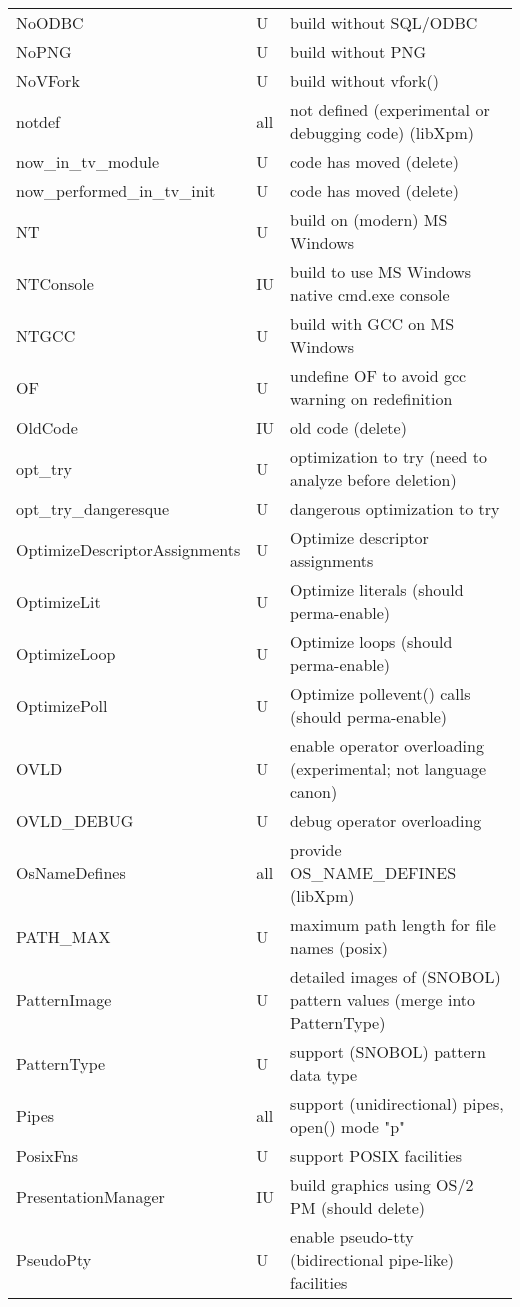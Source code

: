 \begin{xtabular}{|m{1.8in}|m{0.5in}|m{4.0in}|}
NoODBC & U & build without SQL/ODBC \\
NoPNG & U & build without PNG \\
NoVFork & U & build without vfork() \\
notdef & all & not defined (experimental or debugging code) (libXpm) \\
now\_in\_tv\_module & U & code has moved (delete) \\
now\_performed\_in\_tv\_init & U & code has moved (delete) \\
NT & U & build on (modern) MS Windows \\
NTConsole & IU & build to use MS Windows native cmd.exe console \\
NTGCC & U & build with GCC on MS Windows \\
OF & U & undefine OF to avoid gcc warning on redefinition \\
OldCode & IU & old code (delete) \\
opt\_try & U & optimization to try (need to analyze before deletion) \\
opt\_try\_dangeresque & U & dangerous optimization to try  \\
OptimizeDescriptorAssignments & U & Optimize descriptor assignments \\
OptimizeLit & U & Optimize literals (should perma-enable) \\
OptimizeLoop & U & Optimize loops (should perma-enable) \\
OptimizePoll & U & Optimize pollevent() calls (should perma-enable) \\
OVLD & U & enable operator overloading (experimental; not language canon) \\
OVLD\_DEBUG & U & debug operator overloading \\
OsNameDefines & all & provide OS\_NAME\_DEFINES (libXpm) \\
PATH\_MAX & U & maximum path length for file names (posix) \\
PatternImage & U & detailed images of (SNOBOL) pattern values (merge into PatternType) \\
PatternType & U & support (SNOBOL) pattern data type \\
Pipes & all & support (unidirectional) pipes, open() mode "p" \\
PosixFns & U & support POSIX facilities \\
PresentationManager & IU & build graphics using OS/2 PM (should delete) \\
PseudoPty & U & enable pseudo-tty (bidirectional pipe-like) facilities \\

\end{xtabular}
